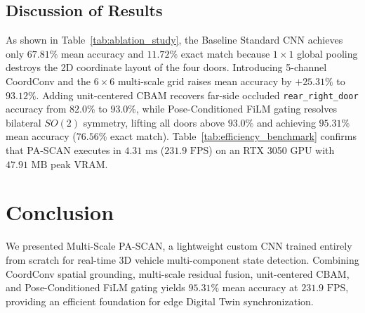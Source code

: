 \documentclass[journal]{IEEEtran}
\begin{document}
\begin{table}[htbp]
\centering
\caption{Computational efficiency and inference throughput of Multi-Scale PA-SCAN.}
\label{tab:efficiency_benchmark}
\end{table}

\subsection{Discussion of Results}
As shown in Table~\ref{tab:ablation_study}, the Baseline Standard CNN achieves only $67.81\%$ mean accuracy and $11.72\%$ exact match because $1\times 1$ global pooling destroys the 2D coordinate layout of the four doors. Introducing 5-channel CoordConv and the $6\times 6$ multi-scale grid raises mean accuracy by $+25.31\%$ to $93.12\%$. Adding unit-centered CBAM recovers far-side occluded \texttt{rear\_right\_door} accuracy from $82.0\%$ to $93.0\%$, while Pose-Conditioned FiLM gating resolves bilateral $SO(2)$ symmetry, lifting all doors above $93.0\%$ and achieving $95.31\%$ mean accuracy ($76.56\%$ exact match). Table~\ref{tab:efficiency_benchmark} confirms that PA-SCAN executes in $4.31\text{ ms}$ ($231.9\text{ FPS}$) on an RTX 3050 GPU with $47.91\text{ MB}$ peak VRAM.

\section{Conclusion}
We presented Multi-Scale PA-SCAN, a lightweight custom CNN trained entirely from scratch for real-time 3D vehicle multi-component state detection. Combining CoordConv spatial grounding, multi-scale residual fusion, unit-centered CBAM, and Pose-Conditioned FiLM gating yields $95.31\%$ mean accuracy at $231.9\text{ FPS}$, providing an efficient foundation for edge Digital Twin synchronization.
\end{document}
